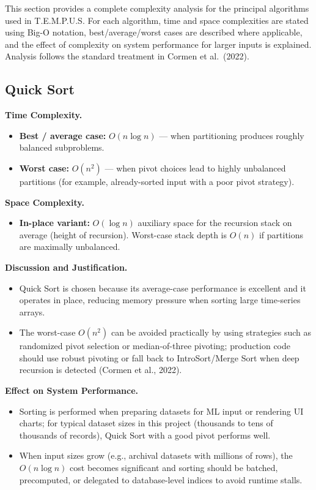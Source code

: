 \documentclass[12pt]{article}
\begin{document}
This section provides a complete complexity analysis for the principal algorithms used in T.E.M.P.U.S. For each algorithm, time and space complexities are stated using Big-O notation, best/average/worst cases are described where applicable, and the effect of complexity on system performance for larger inputs is explained. Analysis follows the standard treatment in Cormen et al.\ (2022).

\subsection{Quick Sort}

\noindent\textbf{Time Complexity.}
\begin{itemize}
    \item \textbf{Best / average case:} $O(n\log n)$ --- when partitioning produces roughly balanced subproblems.
    \item \textbf{Worst case:} $O(n^2)$ --- when pivot choices lead to highly unbalanced partitions (for example, already-sorted input with a poor pivot strategy).
\end{itemize}

\noindent\textbf{Space Complexity.}
\begin{itemize}
    \item \textbf{In-place variant:} $O(\log n)$ auxiliary space for the recursion stack on average (height of recursion). Worst-case stack depth is $O(n)$ if partitions are maximally unbalanced.
\end{itemize}

\noindent\textbf{Discussion and Justification.}
\begin{itemize}
    \item Quick Sort is chosen because its average-case performance is excellent and it operates in place, reducing memory pressure when sorting large time-series arrays.
    \item The worst-case $O(n^2)$ can be avoided practically by using strategies such as randomized pivot selection or median-of-three pivoting; production code should use robust pivoting or fall back to IntroSort/Merge Sort when deep recursion is detected (Cormen et al., 2022).
\end{itemize}

\noindent\textbf{Effect on System Performance.}
\begin{itemize}
    \item Sorting is performed when preparing datasets for ML input or rendering UI charts; for typical dataset sizes in this project (thousands to tens of thousands of records), Quick Sort with a good pivot performs well.
    \item When input sizes grow (e.g., archival datasets with millions of rows), the $O(n\log n)$ cost becomes significant and sorting should be batched, precomputed, or delegated to database-level indices to avoid runtime stalls.
\end{itemize}
\end{document}
